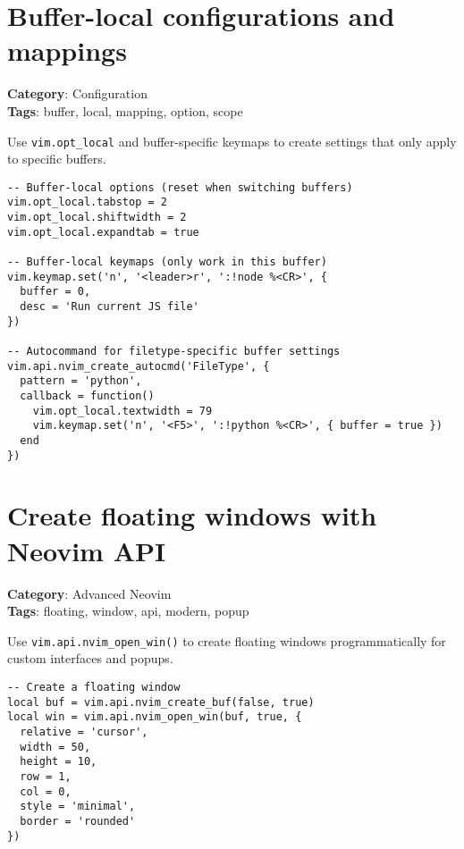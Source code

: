 {{{{{{{\section{Buffer-local configurations and mappings}

\textbf{Category}: Configuration\\ \textbf{Tags}: buffer, local, mapping, option, scope
\vspace{0.5cm}

Use {\footnotesize \Verb§vim.opt_local§} and buffer-specific keymaps to create settings that only apply to specific buffers.

\begin{Exa*}{}
\begin{Verbatim}[fontsize=\footnotesize, breaklines, breakanywhere]
-- Buffer-local options (reset when switching buffers)
vim.opt_local.tabstop = 2
vim.opt_local.shiftwidth = 2
vim.opt_local.expandtab = true

-- Buffer-local keymaps (only work in this buffer)
vim.keymap.set('n', '<leader>r', ':!node %<CR>', {
  buffer = 0,
  desc = 'Run current JS file'
})

-- Autocommand for filetype-specific buffer settings
vim.api.nvim_create_autocmd('FileType', {
  pattern = 'python',
  callback = function()
    vim.opt_local.textwidth = 79
    vim.keymap.set('n', '<F5>', ':!python %<CR>', { buffer = true })
  end
})
\end{Verbatim}
\end{Exa*}

\section{Create floating windows with Neovim API}

\textbf{Category}: Advanced Neovim\\ \textbf{Tags}: floating, window, api, modern, popup
\vspace{0.5cm}

Use {\footnotesize \Verb§vim.api.nvim_open_win()§} to create floating windows programmatically for custom interfaces and popups.

\begin{Exa*}{}
\begin{Verbatim}[fontsize=\footnotesize, breaklines, breakanywhere]
-- Create a floating window
local buf = vim.api.nvim_create_buf(false, true)
local win = vim.api.nvim_open_win(buf, true, {
  relative = 'cursor',
  width = 50,
  height = 10,
  row = 1,
  col = 0,
  style = 'minimal',
  border = 'rounded'
})


\end{Verbatim}
\end{Exa*}}}}}}}}
